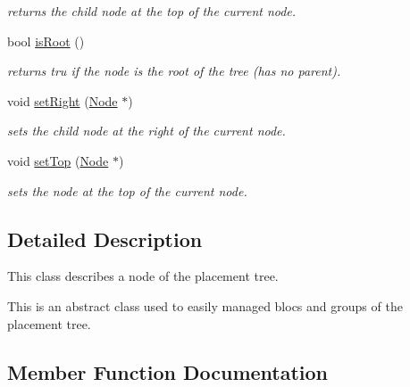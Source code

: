 \begin{DoxyCompactItemize}
\begin{DoxyCompactList}\small\item\em returns the child node at the top of the current node. \end{DoxyCompactList}\item 
\mbox{\label{class_open_chams_1_1_node_ad78e3dab6fc481769907b77419fe4bac}} 
bool \mbox{\hyperlink{class_open_chams_1_1_node_ad78e3dab6fc481769907b77419fe4bac}{is\+Root}} ()
\begin{DoxyCompactList}\small\item\em returns tru if the node is the root of the tree (has no parent). \end{DoxyCompactList}\item 
void \mbox{\hyperlink{class_open_chams_1_1_node_a55d8fa1d2b1c961fcab18acbf67c8be1}{set\+Right}} (\mbox{\hyperlink{class_open_chams_1_1_node}{Node}} $\ast$)
\begin{DoxyCompactList}\small\item\em sets the child node at the right of the current node. \end{DoxyCompactList}\item 
void \mbox{\hyperlink{class_open_chams_1_1_node_a32e2fbbb73c6b7ee4a30189cc30106bf}{set\+Top}} (\mbox{\hyperlink{class_open_chams_1_1_node}{Node}} $\ast$)
\begin{DoxyCompactList}\small\item\em sets the node at the top of the current node. \end{DoxyCompactList}\end{DoxyCompactItemize}


\subsection{Detailed Description}
This class describes a node of the placement tree.

This is an abstract class used to easily managed blocs and groups of the placement tree. 

\subsection{Member Function Documentation}
\mbox{\label{class_open_chams_1_1_node_a55d8fa1d2b1c961fcab18acbf67c8be1}} 
